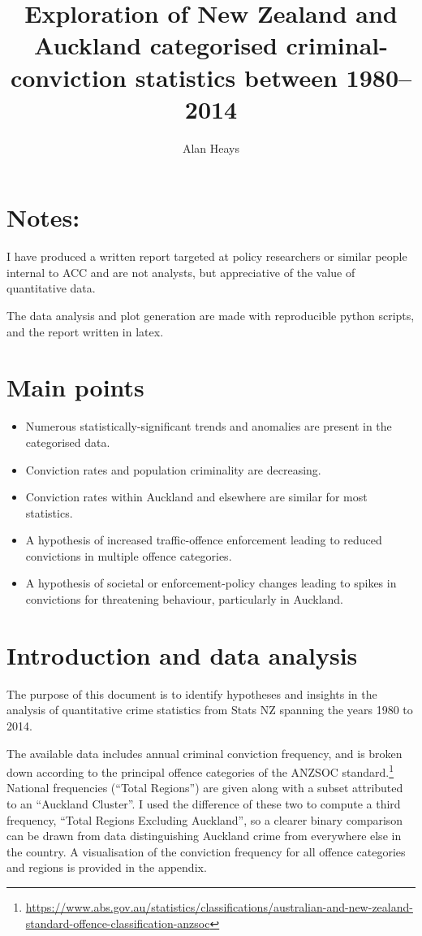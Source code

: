 \documentclass[onecolumn]{myarticle}
\title{Exploration of New Zealand and Auckland categorised criminal-conviction statistics between 1980–2014}
\author{Alan Heays}
\begin{document}
\section*{Notes:}

I have produced a written report targeted at policy researchers or similar people internal to ACC and are not analysts, but appreciative of the value of quantitative data.  

The data analysis and plot generation are made with reproducible python scripts, and the report written in latex.  

\newpage

\maketitle

\section*{Main points}
\begin{itemize}
  \item Numerous statistically-significant trends and anomalies are present in the categorised data.
  \item Conviction rates and population criminality are decreasing.
  \item Conviction rates within Auckland and elsewhere are similar for most statistics.
  \item A hypothesis of increased traffic-offence enforcement leading to reduced convictions in multiple offence categories.
  \item A hypothesis of societal or enforcement-policy changes leading to spikes in convictions for threatening behaviour, particularly in Auckland.
\end{itemize}

\section*{Introduction and data analysis}

The purpose of this document is to identify hypotheses and insights in the analysis of quantitative crime statistics from Stats NZ spanning the years 1980 to 2014.

The available data includes annual criminal conviction frequency, and is broken down according to the principal offence categories of the ANZSOC standard.\footnote{\url{https://www.abs.gov.au/statistics/classifications/australian-and-new-zealand-standard-offence-classification-anzsoc}}
National frequencies (``Total Regions'') are given along with a subset attributed to an ``Auckland Cluster''.  
I used the difference of these two to compute a third frequency, ``Total Regions Excluding Auckland'', so a clearer binary comparison can be drawn from data distinguishing Auckland crime from everywhere else in the country.
A visualisation of the conviction frequency for all offence categories and regions is provided in the appendix.
\end{document}
